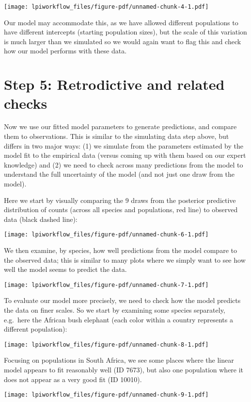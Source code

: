 \documentclass[
  letterpaper,
  DIV=11,
  numbers=noendperiod]{scrartcl}
\begin{document}
\texttt{[image: lpiworkflow\_files/figure-pdf/unnamed-chunk-4-1.pdf]}

Our model may accommodate this, as we have allowed different populations
to have different intercepts (starting population sizes), but the scale
of this variation is much larger than we simulated so we would again
want to flag this and check how our model performs with these data.

\section{Step 5: Retrodictive and related
checks}\label{step-5-retrodictive-and-related-checks}

Now we use our fitted model parameters to generate predictions, and
compare them to observations. This is similar to the simulating data
step above, but differs in two major ways: (1) we simulate from the
parameters estimated by the model fit to the empirical data (versus
coming up with them based on our expert knowledge) and (2) we need to
check across many predictions from the model to understand the full
uncertainty of the model (and not just one draw from the model).

Here we start by visually comparing the 9 draws from the posterior
predictive distribution of counts (across all species and populations,
red line) to observed data (black dashed line):

\texttt{[image: lpiworkflow\_files/figure-pdf/unnamed-chunk-6-1.pdf]}

We then examine, by species, how well predictions from the model compare
to the observed data; this is similar to many plots where we simply want
to see how well the model seems to predict the data.

\texttt{[image: lpiworkflow\_files/figure-pdf/unnamed-chunk-7-1.pdf]}

To evaluate our model more precisely, we need to check how the model
predicts the data on finer scales. So we start by examining some species
separately, e.g.~here the African bush elephant (each color within a
country represents a different population):

\texttt{[image: lpiworkflow\_files/figure-pdf/unnamed-chunk-8-1.pdf]}

Focusing on populations in South Africa, we see some places where the
linear model appears to fit reasonably well (ID 7673), but also one
population where it does not appear as a very good fit (ID 10010).

\texttt{[image: lpiworkflow\_files/figure-pdf/unnamed-chunk-9-1.pdf]}
\end{document}
